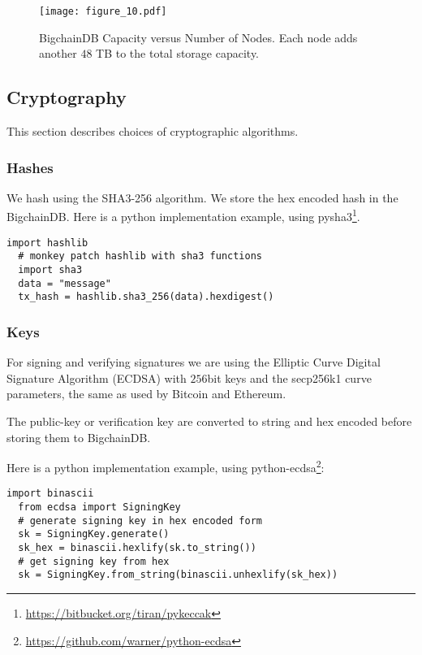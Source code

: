 \begin{figure}[!ht]
  \centering
  \texttt{[image: figure\_10.pdf]}
  \caption{BigchainDB Capacity versus Number of Nodes. Each node adds another $48$ TB to the total storage capacity.}
  \label{fig:bigchain_capacity_vs_nodes}
\end{figure}

\subsection{Cryptography}

This section describes choices of cryptographic algorithms. 

\subsubsection{Hashes}

We hash using the SHA3-256 algorithm. We store the hex encoded hash in the BigchainDB. Here is a python implementation example, using pysha3\footnote{\url{https://bitbucket.org/tiran/pykeccak}}.

\begin{minipage}{\linewidth}
  \begin{lstlisting}[style=python]
  import hashlib 
  # monkey patch hashlib with sha3 functions 
  import sha3 
  data = "message" 
  tx_hash = hashlib.sha3_256(data).hexdigest()\end{lstlisting}
\end{minipage}

\subsubsection{Keys}
For signing and verifying signatures we are using the Elliptic Curve Digital Signature Algorithm (ECDSA) with $256$bit keys and the secp256k1 curve parameters, the same as used by Bitcoin and Ethereum.

The public-key or verification key are converted to string and hex encoded before storing them to BigchainDB.

\medskip
\noindent Here is a python implementation example, using \mbox{python-ecdsa}\footnote{\url{https://github.com/warner/python-ecdsa}}:

\begin{minipage}{\linewidth}
  \begin{lstlisting}[style=python]
  import binascii
  from ecdsa import SigningKey 
  # generate signing key in hex encoded form 
  sk = SigningKey.generate() 
  sk_hex = binascii.hexlify(sk.to_string()) 
  # get signing key from hex 
  sk = SigningKey.from_string(binascii.unhexlify(sk_hex))\end{lstlisting}
\end{minipage}


